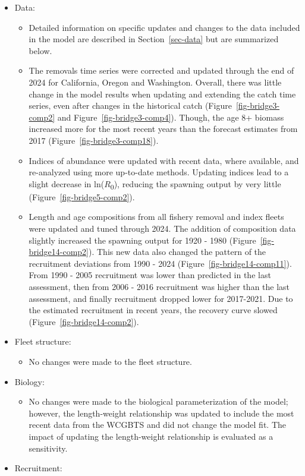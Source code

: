 \documentclass[
  english,
]{article}
\providecommand{\tightlist}{%
  \setlength{\itemsep}{0pt}\setlength{\parskip}{0pt}}
\begin{document}
\begin{itemize}
\tightlist
\item
  Data:

  \begin{itemize}
  \tightlist
  \item
    Detailed information on specific updates and changes to the data
    included in the model are described in Section~\ref{sec-data} but
    are summarized below.
  \item
    The removals time series were corrected and updated through the end
    of 2024 for California, Oregon and Washington. Overall, there was
    little change in the model results when updating and extending the
    catch time series, even after changes in the historical catch
    (Figure~\ref{fig-bridge3-comp2} and Figure~\ref{fig-bridge3-comp4}).
    Though, the age 8+ biomass increased more for the most recent years
    than the forecast estimates from 2017
    (Figure~\ref{fig-bridge3-comp18}).
  \item
    Indices of abundance were updated with recent data, where available,
    and re-analyzed using more up-to-date methods. Updating indices lead
    to a slight decrease in ln(\(R\)\textsubscript{0}), reducing the
    spawning output by very little (Figure~\ref{fig-bridge5-comp2}).
  \item
    Length and age compositions from all fishery removal and index
    fleets were updated and tuned through 2024. The addition of
    composition data slightly increased the spawning output for 1920 -
    1980 (Figure~\ref{fig-bridge14-comp2}). This new data also changed
    the pattern of the recruitment deviations from 1990 - 2024
    (Figure~\ref{fig-bridge14-comp11}). From 1990 - 2005 recruitment was
    lower than predicted in the last assessment, then from 2006 - 2016
    recruitment was higher than the last assessment, and finally
    recruitment dropped lower for 2017-2021. Due to the estimated
    recruitment in recent years, the recovery curve slowed
    (Figure~\ref{fig-bridge14-comp2}).
  \end{itemize}
\item
  Fleet structure:

  \begin{itemize}
  \tightlist
  \item
    No changes were made to the fleet structure.
  \end{itemize}
\item
  Biology:

  \begin{itemize}
  \tightlist
  \item
    No changes were made to the biological parameterization of the
    model; however, the length-weight relationship was updated to
    include the most recent data from the WCGBTS and did not change the
    model fit. The impact of updating the length-weight relationship is
    evaluated as a sensitivity.
  \end{itemize}
\item
  Recruitment:


\end{itemize}
\end{document}
